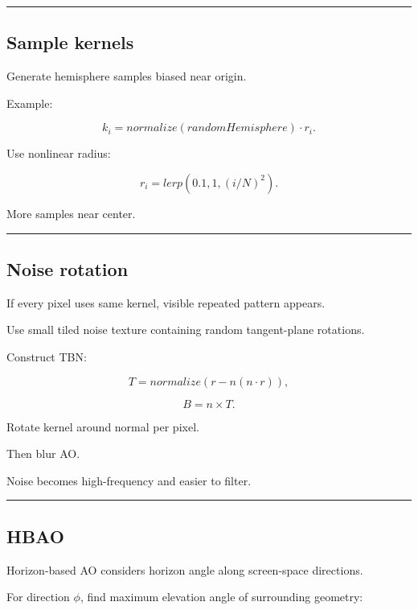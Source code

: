 \begin{center}\rule{0.5\linewidth}{0.5pt}\end{center}

\subsection{Sample kernels}\label{04-visual-computing-ii-ch040-sample-kernels}

Generate hemisphere samples biased near origin.

Example:

\[
k_i=
normalize(randomHemisphere)
\cdot r_i.
\]

Use nonlinear radius:

\[
r_i=
lerp(
0.1,
1,
(i/N)^2
).
\]

More samples near center.

\begin{center}\rule{0.5\linewidth}{0.5pt}\end{center}

\subsection{Noise rotation}\label{04-visual-computing-ii-ch040-noise-rotation}

If every pixel uses same kernel, visible repeated pattern appears.

Use small tiled noise texture containing random tangent-plane rotations.

Construct TBN:

\[
T=
normalize(
r-n(n\cdot r)
),
\]

\[
B=n\times T.
\]

Rotate kernel around normal per pixel.

Then blur AO.

Noise becomes high-frequency and easier to filter.

\begin{center}\rule{0.5\linewidth}{0.5pt}\end{center}

\subsection{HBAO}\label{04-visual-computing-ii-ch040-hbao}

Horizon-based AO considers horizon angle along screen-space directions.

For direction \(\phi\), find maximum elevation angle of surrounding geometry:

